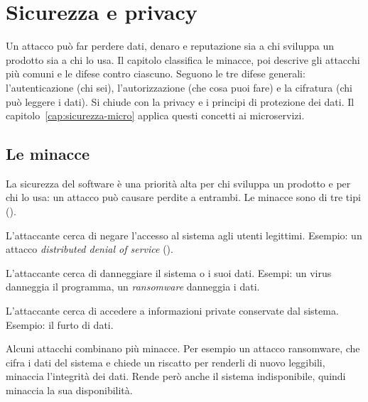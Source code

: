 \chapter{Sicurezza e privacy}
\label{cap:sicurezza}

\begin{inbreve}
Un attacco può far perdere dati, denaro e reputazione sia a chi sviluppa un prodotto sia a chi lo usa. Il capitolo
classifica le minacce, poi descrive gli attacchi più comuni e le difese contro ciascuno. Seguono le tre difese
generali: l'autenticazione (chi sei), l'autorizzazione (che cosa puoi fare) e la cifratura (chi può leggere i dati).
Si chiude con la privacy e i principi di protezione dei dati. Il capitolo~\ref{cap:sicurezza-micro} applica questi
concetti ai microservizi.
\end{inbreve}

\section{Le minacce}
\label{sec:sic-minacce}

La sicurezza del software è una priorità alta per chi sviluppa un prodotto e per chi lo usa: un attacco può causare
perdite a entrambi. Le minacce sono di tre tipi ().

\begin{definizione}
\begin{description}[leftmargin=0pt, style=unboxed]
  \item[Availability threat.] L'attaccante cerca di negare l'accesso al sistema agli utenti legittimi. Esempio: un
    attacco \emph{distributed denial of service} ().
  \item[Integrity threat.] L'attaccante cerca di danneggiare il sistema o i suoi dati. Esempi: un virus danneggia il
    programma, un \emph{ransomware} danneggia i dati.
  \item[Confidentiality threat.] L'attaccante cerca di accedere a informazioni private conservate dal sistema. Esempio:
    il furto di dati.
\end{description}
\end{definizione}

Alcuni attacchi combinano più minacce. Per esempio un attacco ransomware, che cifra i dati del sistema e chiede un
riscatto per renderli di nuovo leggibili, minaccia l'integrità dei dati. Rende però anche il sistema indisponibile,
quindi minaccia la sua disponibilità.

